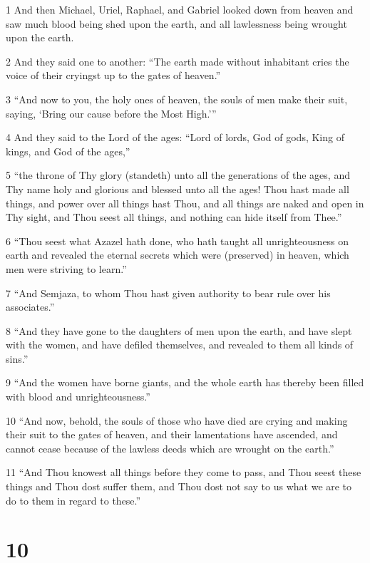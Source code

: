 \par 1 And then Michael, Uriel, Raphael, and Gabriel looked down from heaven and saw much blood being shed upon the earth, and all lawlessness being wrought upon the earth.
\par 2 And they said one to another: “The earth made without inhabitant cries the voice of their cryingst up to the gates of heaven.”
\par 3 “And now to you, the holy ones of heaven, the souls of men make their suit, saying, ‘Bring our cause before the Most High.’”
\par 4 And they said to the Lord of the ages: “Lord of lords, God of gods, King of kings, and God of the ages,”
\par 5 “the throne of Thy glory (standeth) unto all the generations of the ages, and Thy name holy and glorious and blessed unto all the ages! Thou hast made all things, and power over all things hast Thou, and all things are naked and open in Thy sight, and Thou seest all things, and nothing can hide itself from Thee.”
\par 6 “Thou seest what Azazel hath done, who hath taught all unrighteousness on earth and revealed the eternal secrets which were (preserved) in heaven, which men were striving to learn.”
\par 7 “And Semjaza, to whom Thou hast given authority to bear rule over his associates.”
\par 8 “And they have gone to the daughters of men upon the earth, and have slept with the women, and have defiled themselves, and revealed to them all kinds of sins.”
\par 9 “And the women have borne giants, and the whole earth has thereby been filled with blood and unrighteousness.”
\par 10 “And now, behold, the souls of those who have died are crying and making their suit to the gates of heaven, and their lamentations have ascended, and cannot cease because of the lawless deeds which are wrought on the earth.”
\par 11 “And Thou knowest all things before they come to pass, and Thou seest these things and Thou dost suffer them, and Thou dost not say to us what we are to do to them in regard to these.”

\chapter{10}

